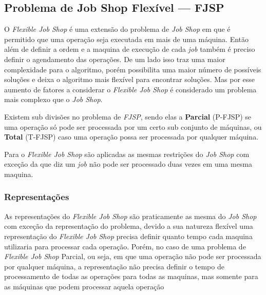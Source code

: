     \subsection{Problema de Job Shop Flexível — FJSP}
            O \textit{Flexible Job Shop} é uma extensão do problema de \textit{Job Shop} em que é permitido que uma operação seja executada em mais de uma máquina. Então além de definir a ordem e a maquina de execução de cada \textit{job} também é preciso definir o agendamento das operações.\newline 
            De um lado isso traz uma maior complexidade para o algoritmo, porém possibilita uma maior número de possíveis soluções e deixa o algoritmo mais flexível para encontrar soluções. Mas por esse aumento de fatores a considerar o \textit{Flexible Job Shop} é considerado um problema mais complexo que o \textit{Job Shop}.\newline

            Existem sub divisões no problema de \textit{FJSP}, sendo elas a \textbf{Parcial} (P-FJSP) se uma operação só pode ser processada por um certo sub conjunto de máquinas, ou \textbf{Total} (T-FJSP) caso uma operação possa ser processada por qualquer máquina.\newline

            Para o \textit{Flexible Job Shop} são aplicadas as mesmas restrições do \textit{Job Shop} com exceção da que diz um \textit{job} não pode ser processado duas vezes em uma mesma maquina.\newline

        \subsubsection{Representações}
            As representações do \textit{Flexible Job Shop} são praticamente as mesma do \textit{Job Shop} com exceção da representação do problema, devido a sua natureza flexível uma representação do \textit{Flexible Job Shop} precisa definir quanto tempo cada maquina utilizaria para processar cada operação. Porém, no caso de uma problema de \textit{Flexible Job Shop} Parcial, ou seja, em que uma operação não pode ser processada por qualquer máquina, a representação não precisa definir o tempo de processamento de todas as operações para todas as maquinas, mas somente para as máquinas que podem processar aquela operação


